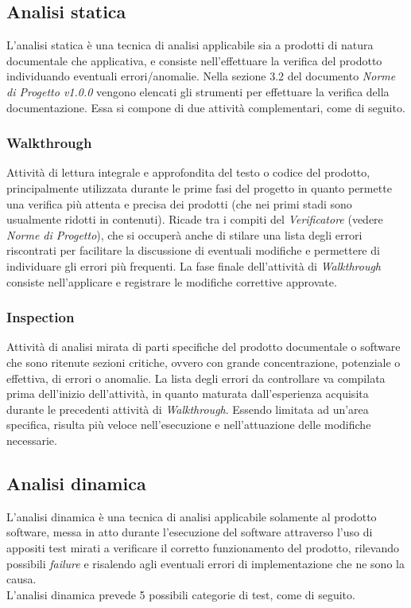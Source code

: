 
\subsection{Analisi statica}
L'analisi statica è una tecnica di analisi applicabile sia a prodotti di natura documentale che applicativa, e consiste nell'effettuare la verifica del prodotto individuando eventuali errori/anomalie. Nella sezione 3.2 del documento \emph{Norme di Progetto v1.0.0} vengono elencati gli strumenti per effettuare la verifica della documentazione. Essa si compone di due attività complementari, come di seguito.

\subsubsection{Walkthrough}
Attività di lettura integrale e approfondita del testo o codice del prodotto, principalmente utilizzata durante le prime fasi del progetto in quanto permette una verifica più attenta e precisa dei prodotti (che nei primi stadi sono usualmente ridotti in contenuti). Ricade tra i compiti del \emph{Verificatore} (vedere \emph{Norme di Progetto}), che si occuperà anche di stilare una lista degli errori riscontrati per facilitare la discussione di eventuali modifiche e permettere di individuare gli errori più frequenti. La fase finale dell'attività di \emph{Walkthrough} consiste nell'applicare e registrare le modifiche correttive approvate.

\subsubsection{Inspection}
Attività di analisi mirata di parti specifiche del prodotto documentale o software che sono ritenute sezioni critiche, ovvero con grande concentrazione, potenziale o effettiva, di errori o anomalie. La lista degli errori da controllare va compilata prima dell'inizio dell'attività, in quanto maturata dall'esperienza acquisita durante le precedenti attività di \emph{Walkthrough}. Essendo limitata ad un'area specifica, risulta più veloce nell'esecuzione e nell'attuazione delle modifiche necessarie.

\subsection{Analisi dinamica}
L'analisi dinamica è una tecnica di analisi applicabile solamente al prodotto software, messa in atto durante l'esecuzione del software attraverso l'uso di appositi test mirati a verificare il corretto funzionamento del prodotto, rilevando possibili \emph{failure} e risalendo agli eventuali errori di implementazione che ne sono la causa.\\
L'analisi dinamica prevede 5 possibili categorie di test, come di seguito. 

